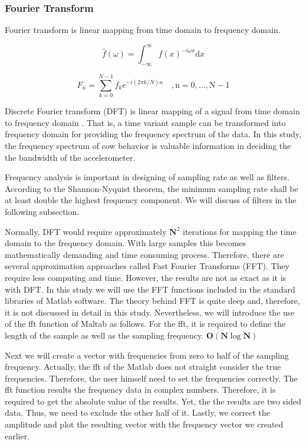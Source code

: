 \documentclass[english,12pt,a4paper,pdftex,elec,utf8]{aaltothesis}
\begin{document}
\subsubsection{Fourier Transform} \label{fouriertransformsection}

Fourier transform is linear mapping from time domain to frequency domain.

\begin{equation}
\hat{f}(\omega) =  \int_{- \infty} ^{\infty} f(x) ^{-i\omega x} \mathrm{d}x
\end{equation} \label{fouriertransformequation}

\begin{equation}
F_n =  \sum \limits^{N-1}_{k=0} f_k e^{-i(2\pi k / N) n} \mathrm{\hspace{1em} , n = 0, \dots , N -1} 
\end{equation}\label{fftequation}

Discrete Fourier transform (DFT) is linear mapping of a signal from time domain to frequency domain \cite{rao2012fast}. That is, a time variant sample can be transformed into frequency domain for providing the frequency spectrum of the data. In this study, the frequency spectrum of cow behavior is valuable information in deciding the the bandwidth of the accelerometer.


Frequency analysis is important in designing of sampling rate as well as filters. According to the Shannon-Nyquist theorem, the minimum sampling rate shall be at least double the highest frequency component. We will discuss of filters in the following subsection.

Normally, DFT would require approximately $\mathbf{N}^2$ iterations for mapping the time domain to the frequency domain. With large samples this becomes mathematically demanding and time consuming process. Therefore, there are several approximation approaches called Fast Fourier Transforms (FFT). They require less computing and time. However, the results are not as exact as it is with DFT. In this study we will use the FFT functions included in the standard libraries of Matlab software. The theory behind FFT is quite deep and, therefore, it is not discussed in detail in this study. Nevertheless, we will introduce the use of the fft function of Maltab as follows. For the fft, it is required to define the length of the sample as well as the sampling frequency. $\mathbf{O}( \mathbf{N} \log \mathbf{N})$

Next we will create a vector with frequencies from zero to half of the sampling frequency. Actually, the fft of the Matlab does not straight consider the true frequencies. Therefore, the user himself need to set the frequencies correctly. The fft function results the frequency data in complex numbers. Therefore, it is required to get the absolute value of the results. Yet, the the results are two sided data. Thus, we need to exclude the other half of it. Lastly, we correct the amplitude and plot the resulting vector with the frequency vector we created earlier.
\end{document}
